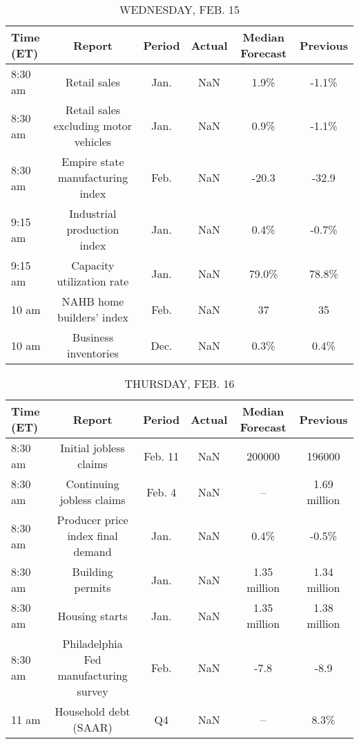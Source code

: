 \documentclass{article}%
\begin{document}
%


\begin{table}[htbp]%
\caption{WEDNESDAY, FEB. 15}%
\centering%
\begin{adjustbox}{width=1\textwidth}%
\begin{tabular}{lccccc}
\toprule
Time (ET) &                                Report & Period & Actual & Median Forecast & Previous \\
\midrule
  8:30 am &                          Retail sales &   Jan. &    NaN &            1.9\% &    -1.1\% \\
  8:30 am & Retail sales excluding motor vehicles &   Jan. &    NaN &            0.9\% &    -1.1\% \\
  8:30 am &      Empire state manufacturing index &   Feb. &    NaN &           -20.3 &    -32.9 \\
  9:15 am &           Industrial production index &   Jan. &    NaN &            0.4\% &    -0.7\% \\
  9:15 am &             Capacity utilization rate &   Jan. &    NaN &           79.0\% &    78.8\% \\
    10 am &             NAHB home builders' index &   Feb. &    NaN &              37 &       35 \\
    10 am &                  Business inventories &   Dec. &    NaN &            0.3\% &     0.4\% \\
\bottomrule
\end{tabular}
%
\end{adjustbox}%
\end{table}

%


\begin{table}[htbp]%
\caption{THURSDAY, FEB. 16}%
\centering%
\begin{adjustbox}{width=1\textwidth}%
\begin{tabular}{lccccc}
\toprule
Time (ET) &                                Report &  Period & Actual & Median Forecast &     Previous \\
\midrule
  8:30 am &                Initial jobless claims & Feb. 11 &    NaN &          200000 &       196000 \\
  8:30 am &             Continuing jobless claims &  Feb. 4 &    NaN &              -- & 1.69 million \\
  8:30 am &     Producer price index final demand &    Jan. &    NaN &            0.4\% &        -0.5\% \\
  8:30 am &                      Building permits &    Jan. &    NaN &    1.35 million & 1.34 million \\
  8:30 am &                        Housing starts &    Jan. &    NaN &    1.35 million & 1.38 million \\
  8:30 am & Philadelphia Fed manufacturing survey &    Feb. &    NaN &            -7.8 &         -8.9 \\
    11 am &                 Household debt (SAAR) &      Q4 &    NaN &              -- &         8.3\% \\
\bottomrule
\end{tabular}
%
\end{adjustbox}%
\end{table}
\end{document}
